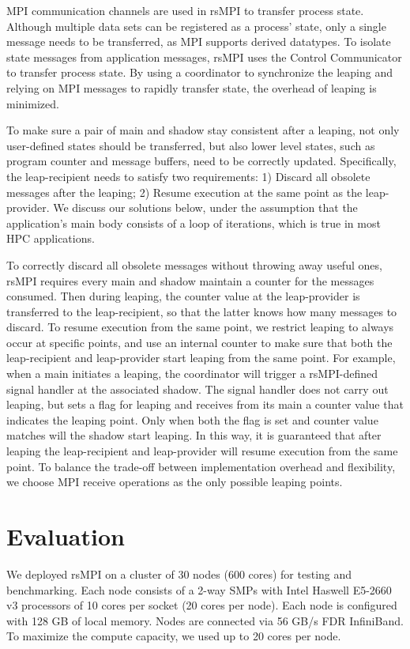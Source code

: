 MPI communication channels are used in rsMPI to transfer process state. Although multiple data sets can be registered as a process' state, only a single message needs to be transferred, as MPI supports derived datatypes. To isolate state messages from application messages, rsMPI uses the Control Communicator to transfer process state.  
By using a coordinator to synchronize the leaping and relying on  MPI messages to rapidly transfer state, the overhead of leaping is minimized. 

To make sure a pair of main and shadow stay consistent after a leaping, not only user-defined states should be transferred, but also lower level states, such as program counter and message buffers, need to be correctly updated. Specifically, the leap-recipient needs to satisfy two requirements:  
1) Discard all obsolete messages after the leaping; 2) Resume execution at the same point as the leap-provider. We discuss our solutions below, under the assumption that the application's main body consists of a loop of iterations, which is true in most HPC applications.

To correctly discard all obsolete messages without throwing away useful ones, rsMPI requires every main and shadow maintain a counter for the messages consumed. Then during leaping, the counter value at the leap-provider is transferred to the leap-recipient, so that the latter knows how many messages to discard.
To resume execution from the same point, we restrict leaping to always occur at specific points, and use an internal counter to make sure that both the leap-recipient and leap-provider start leaping from the same point. For example, when a main initiates a leaping, the coordinator will trigger a rsMPI-defined signal handler at the associated shadow. The signal handler does not carry out leaping, but sets a flag for leaping and receives from its main a counter value that indicates the leaping point. %
Only when both the flag is set and counter value matches will the shadow start leaping. In this way, it is guaranteed that after leaping the leap-recipient and leap-provider will resume execution from the same point. To balance the trade-off between implementation overhead and flexibility, we choose MPI receive operations as the only possible leaping points. 

\section{Evaluation}
We deployed rsMPI on a cluster of 30 nodes (600 cores) for testing and benchmarking. Each node consists of a 2-way SMPs with Intel Haswell E5-2660 v3 processors of 10 cores per socket (20 cores per node). Each node is configured with 128 GB of local memory. Nodes are connected via 56 GB/s FDR InfiniBand. To maximize the compute capacity, we used up to 20 cores per node.

